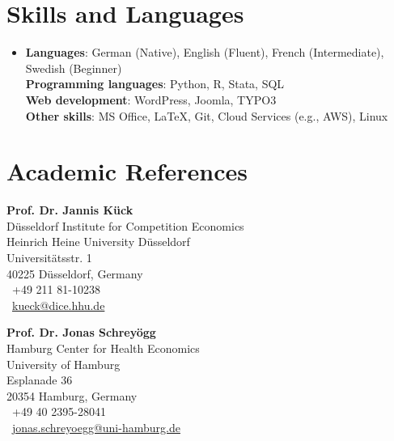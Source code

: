 \documentclass[a4paper,11pt]{article}
\begin{document}
\section{\textbf{Skills and Languages}}

\begin{itemize}[leftmargin=0.05in, label={}]
    \item{
    \textbf{Languages}{: German (Native), English (Fluent), French (Intermediate), Swedish (Beginner)} \\
    \textbf{Programming languages}{: Python, R, Stata, SQL} \\
    \textbf{Web development}{: WordPress, Joomla, TYPO3} \\
    \textbf{Other skills}{: MS Office, LaTeX, Git, Cloud Services (e.g., AWS), Linux}
    }
\end{itemize}

\section{\textbf{Academic References}}

\begin{minipage}[t]{0.5\textwidth}
\textbf{Prof. Dr. Jannis Kück}\\
Düsseldorf Institute for Competition Economics\\
Heinrich Heine University Düsseldorf\\
Universitätsstr. 1\\
40225 Düsseldorf, Germany\\
\faPhone\ +49 211 81-10238\\
\faEnvelope\ \href{mailto:kueck@dice.hhu.de}{kueck@dice.hhu.de}
\end{minipage}
\hfill
\begin{minipage}[t]{0.4\textwidth}
\textbf{Prof. Dr. Jonas Schreyögg}\\
Hamburg Center for Health Economics\\
University of Hamburg\\
Esplanade 36\\
20354 Hamburg, Germany\\
\faPhone\ +49 40 2395-28041\\
\faEnvelope\ \href{mailto:jonas.schreyoegg@uni-hamburg.de}
{jonas.schreyoegg@uni-hamburg.de}
\end{minipage}
\end{document}
